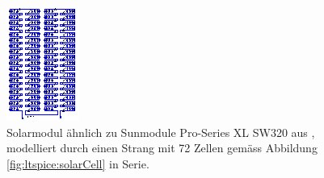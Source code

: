 \begin{figure}[h!tb]
    \centering
    \includegraphics[width=\textwidth]{images/ltspice/module-72cells--72x1.eps}
    \caption{%
        Solarmodul   \"ahnlich   zu   Sunmodule  Pro-Series   XL   SW320   aus
        \cite{ref:solar:sunmodulePro},  modelliert durch  einen Strang  mit 72
        Zellen gem\"ass Abbildung \ref{fig:ltspice:solarCell} in Serie.%
    }
    \label{fig:ltspice:module:cellBased:72x1}
\end{figure}

